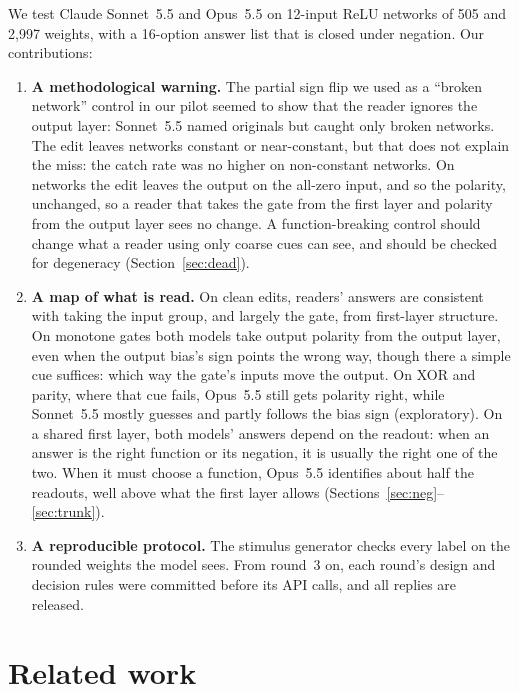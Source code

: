 \documentclass[10pt]{article}
\newcommand{\Sonnet}{Sonnet~5.5}
\newcommand{\Opus}{Opus~5.5}
\begin{document}
We test Claude \Sonnet{} and \Opus{} \citep{anthropic2026models} on 12-input ReLU networks of 505 and 2,997 weights, with a 16-option answer list that is closed under negation. Our contributions:
\begin{enumerate}
\item \textbf{A methodological warning.} The partial sign flip we used as a ``broken network'' control in our pilot seemed to show that the reader ignores the output layer: \Sonnet{} named \nPilotOrig{} originals but caught only \nPilotCaught{} broken networks. The edit leaves \nPilotDeadNear{} networks constant or near-constant, but that does not explain the miss: the catch rate was no higher on non-constant networks. On \nPilotZeroSame{} networks the edit leaves the output on the all-zero input, and so the polarity, unchanged, so a reader that takes the gate from the first layer and polarity from the output layer sees no change. A function-breaking control should change what a reader using only coarse cues can see, and should be checked for degeneracy (Section~\ref{sec:dead}).
\item \textbf{A map of what is read.} On clean edits, readers' answers are consistent with taking the input group, and largely the gate, from first-layer structure. On monotone gates both models take output polarity from the output layer, even when the output bias's sign points the wrong way, though there a simple cue suffices: which way the gate's inputs move the output. On XOR and parity, where that cue fails, \Opus{} still gets polarity right, while \Sonnet{} mostly guesses and partly follows the bias sign (exploratory). On a shared first layer, both models' answers depend on the readout: when an answer is the right function or its negation, it is usually the right one of the two. When it must choose a function, \Opus{} identifies about half the readouts, well above what the first layer allows (Sections~\ref{sec:neg}--\ref{sec:trunk}).
\item \textbf{A reproducible protocol.} The stimulus generator checks every label on the rounded weights the model sees. From round~3 on, each round's design and decision rules were committed before its API calls, and all \nRFiveTotalCalls{} replies are released.
\end{enumerate}

\section{Related work}
\end{document}
